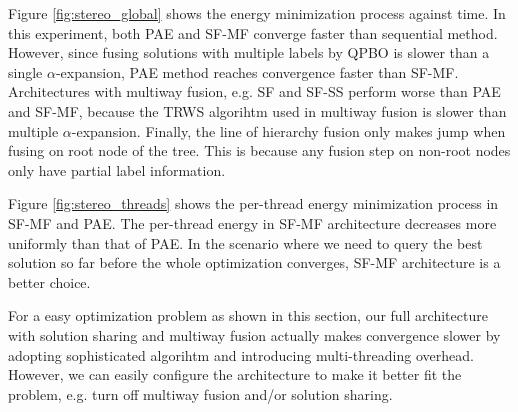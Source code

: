 Figure \ref{fig:stereo_global} shows the energy minimization process
against time. In this experiment, both PAE and SF-MF converge faster
than sequential method. However, since fusing solutions with multiple
labels by QPBO is slower than a single $\alpha$-expansion, PAE method
reaches convergence faster than SF-MF. Architectures with multiway
fusion, e.g. SF and SF-SS perform worse than PAE and SF-MF, because
the TRWS algorihtm used in multiway fusion is slower than multiple
$\alpha$-expansion. Finally, the line of hierarchy fusion only makes
jump when fusing on root node of the tree. This is because any fusion
step on non-root nodes only have partial label information.

Figure \ref{fig:stereo_threads} shows the per-thread energy
minimization process in SF-MF and PAE. The per-thread energy in SF-MF
architecture decreases more uniformly than that of PAE. In the
scenario where we need to query the best solution so far before the
whole optimization converges, SF-MF architecture is a better choice.

For a easy optimization problem as shown in this section, our full
architecture with solution sharing and multiway fusion actually makes
convergence slower by adopting sophisticated algorihtm and introducing
multi-threading overhead. However, we can easily configure the
architecture to make it better fit the problem, e.g. turn off multiway
fusion and/or solution sharing.

